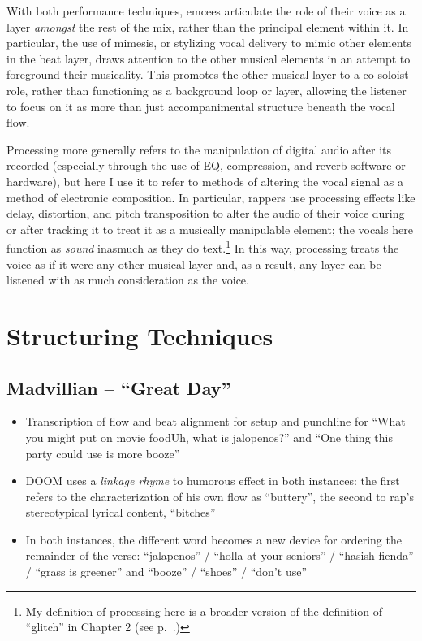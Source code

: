 With both performance techniques, emcees articulate the role of their voice as a layer \emph{amongst} the rest 
of the mix, rather than the principal element within it. In particular, the use of mimesis, or stylizing vocal 
delivery to mimic other elements in the beat layer, draws attention to the other musical elements in an attempt
to foreground their musicality. This promotes the other musical layer to a co-soloist role, rather than 
functioning as a background loop or layer, allowing the listener to focus on it as more than just accompanimental
structure beneath the vocal flow.

Processing more generally refers to the manipulation of digital audio after its recorded (especially through
the use of EQ, compression, and reverb software or hardware), but here I use it to refer to methods of altering
the vocal signal as a method of electronic composition. In particular, rappers use processing effects like delay, 
distortion, and pitch transposition to alter the audio of their voice during or after tracking it to treat it 
as a musically manipulable element; the vocals here function as \emph{sound} inasmuch as they do text.\footnote{
    My definition of processing here is a broader version of the definition of ``glitch'' in Chapter 2 
    (see p.~\pageref{glitch}.)}
In this way, processing treats the voice as if it were any other musical layer and, as a result, any layer can
be listened with as much consideration as the voice.


\newpage
\section{Structuring Techniques}
\subsection*{\centering Madvillian -- ``Great Day''}

\begin{itemize}
    \item Transcription of flow and beat alignment for setup and punchline for ``What you might put on 
    movie food\textellipsis Uh, what is jalopenos?'' and ``One thing this party could use is more\textellipsis
    booze''
    \item DOOM uses a \emph{linkage rhyme} to humorous effect in both instances: the first refers to 
    the characterization of his own flow as ``buttery'', the second to rap's stereotypical lyrical content,
    ``bitches''
    \item In both instances, the different word becomes a new device for ordering the remainder of the 
    verse: ``jalapenos'' / ``holla at your seniors'' / ``hasish fienda'' / ``grass is greener'' and 
    ``booze'' / ``shoes'' / ``don't use''
\end{itemize}

